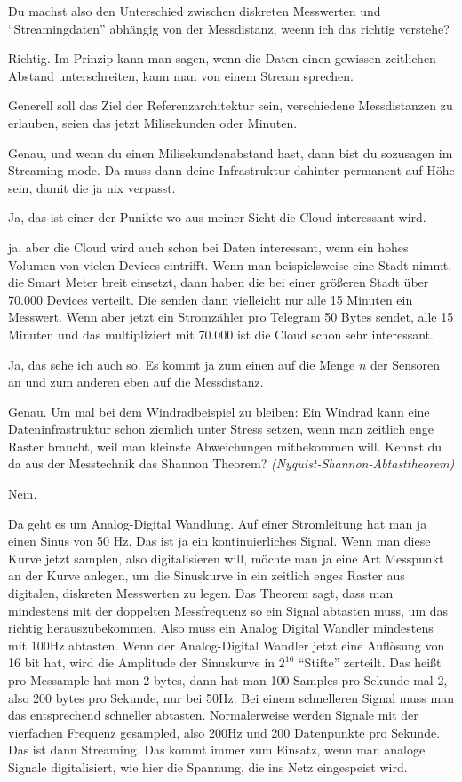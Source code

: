 \LF Du machst also den Unterschied zwischen diskreten Messwerten und \enquote{Streamingdaten} abhängig von der Messdistanz, weenn ich das richtig verstehe?

\PE Richtig. Im Prinzip kann man sagen, wenn die Daten einen gewissen zeitlichen Abstand unterschreiten, kann man von einem Stream sprechen. 

\LF Generell soll das Ziel der Referenzarchitektur sein, verschiedene Messdistanzen zu erlauben, seien das jetzt Milisekunden oder Minuten.

\PE Genau, und wenn du einen Milisekundenabstand hast, dann bist du sozusagen im Streaming mode. Da muss dann deine Infrastruktur dahinter permanent auf Höhe sein, damit die ja nix verpasst. 

\LF Ja, das ist einer der Punikte wo aus meiner Sicht die Cloud interessant wird.

\PE ja, aber die Cloud wird auch schon bei Daten interessant, wenn ein hohes Volumen von vielen Devices eintrifft. Wenn man beispielsweise eine Stadt nimmt, die Smart Meter breit einsetzt, dann haben die bei einer größeren Stadt über 70.000 Devices verteilt. Die senden dann vielleicht nur alle 15 Minuten ein Messwert. Wenn aber jetzt ein Stromzähler pro Telegram 50 Bytes sendet, alle 15 Minuten und das multipliziert mit 70.000 ist die Cloud schon sehr interessant.

\LF Ja, das sehe ich auch so. Es kommt ja zum einen auf die Menge $n$ der Sensoren an und zum anderen eben auf die Messdistanz.

\PE Genau. Um mal bei dem Windradbeispiel zu bleiben: Ein Windrad kann eine Dateninfrastruktur schon ziemlich unter Stress setzen, wenn man zeitlich enge Raster braucht, weil man kleinste Abweichungen mitbekommen will. Kennst du da aus der Messtechnik das Shannon Theorem? \textit{(Nyquist-Shannon-Abtasttheorem)}

\LF Nein.

\PE Da geht es um Analog-Digital Wandlung. Auf einer Stromleitung hat man ja einen Sinus von 50 Hz. Das ist ja ein kontinuierliches Signal. Wenn man diese Kurve jetzt samplen, also digitalisieren will, möchte man ja eine Art Messpunkt an der Kurve anlegen, um die Sinuskurve in ein zeitlich enges Raster aus digitalen, diskreten Messwerten zu legen. Das Theorem sagt, dass man mindestens  mit der doppelten Messfrequenz so ein Signal abtasten muss, um das richtig herauszubekommen. Also muss ein Analog Digital Wandler mindestens mit 100Hz abtasten. Wenn der Analog-Digital Wandler jetzt eine Auflösung von 16 bit hat, wird die Amplitude der Sinuskurve in $2^{16}$ \enquote{Stifte} zerteilt. Das heißt pro Messample hat man 2 bytes, dann hat man 100 Samples pro Sekunde mal 2, also 200 bytes pro Sekunde, nur bei 50Hz. Bei einem schnelleren Signal muss man das entsprechend schneller abtasten. Normalerweise werden Signale mit der vierfachen Frequenz gesampled, also 200Hz und 200 Datenpunkte pro Sekunde. Das ist dann Streaming. Das kommt immer zum Einsatz, wenn man analoge Signale digitalisiert, wie hier die Spannung, die  ins Netz eingespeist wird.

